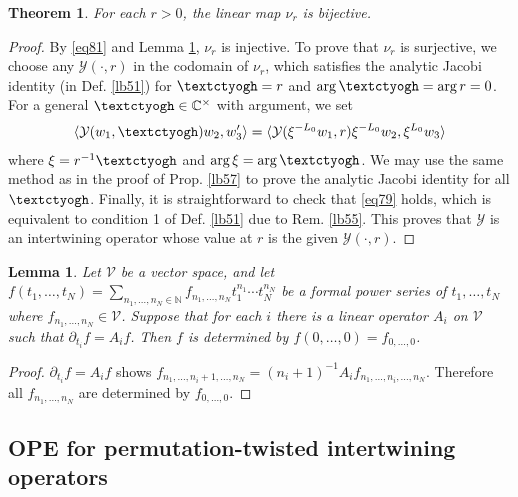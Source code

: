 \documentclass[11pt,b5paper,notitlepage]{article}
\theoremstyle{definition}
\theoremstyle{plain}
\newtheorem{thm}[df]{Theorem}
\newtheorem{lm}[df]{Lemma}
\newcommand{\mc}{\mathcal}
\newcommand{\bk}[1]{\langle {#1}\rangle}
\newcommand{\Cbb}{\mathbb C}
\newcommand{\Nbb}{\mathbb N}
\newcommand{\tipaz}{\text{\textctyogh}}
\numberwithin{equation}{subsection}
\begin{document}
\begin{thm}
For each $r>0$, the linear map $\nu_r$ is bijective.
\end{thm}


\begin{proof}
By \eqref{eq81} and Lemma \ref{lb68}, $\nu_r$ is injective. To prove that $\nu_r$ is surjective, we choose any $\mc Y(\cdot,r)$ in the codomain of $\nu_r$, which satisfies the analytic Jacobi identity (in Def. \ref{lb51}) for $\tipaz=r$ and $\arg\tipaz=\arg r=0$. For a general $\tipaz\in\Cbb^\times$ with argument, we set
\begin{align*}
\bk{\mc Y(w_1,\tipaz)w_2,w_3'}=\bk{\mc Y(\xi^{-L_0}w_1,r)\xi^{-L_0}w_2,\xi^{L_0}w_3}	
\end{align*}
where $\xi=r^{-1}\tipaz$ and $\arg\xi=\arg\tipaz$. We may use the same method as in the proof of Prop. \ref{lb57} to prove the analytic Jacobi identity for all $\tipaz$. Finally, it is straightforward to check that \eqref{eq79} holds, which is equivalent to condition 1 of Def. \ref{lb51} due to Rem. \ref{lb55}. This proves that $\mc Y$ is an intertwining operator whose value at $r$ is the given $\mc Y(\cdot,r)$.
\end{proof}

\begin{lm}\label{lb68}
Let $\mc V$ be a vector space, and let $f(t_1,\dots,t_N)=\sum_{n_1,\dots,n_N\in\Nbb}f_{n_1,\dots,n_N}t_1^{n_1}\cdots t_N^{n_N}$ be a formal power series of $t_1,\dots,t_N$ where  $f_{n_1,\dots,n_N}\in\mc V$. Suppose that for each $i$ there is a linear operator $A_i$ on $\mc V$ such that $\partial_{t_i}f=A_if$. Then $f$ is determined by $f(0,\dots,0)=f_{0,\dots,0}$.
\end{lm}


\begin{proof}
	$\partial_{t_i}f=A_if$ shows $f_{n_1,\dots,n_i+1,\dots,n_N}=(n_i+1)^{-1}A_if_{n_1,\dots,n_i,\dots,n_N}$. Therefore all $f_{n_1,\dots,n_N}$ are determined by $f_{0,\dots,0}$.
\end{proof}




\subsection{OPE for permutation-twisted intertwining operators}\label{lb71}
\end{document}
